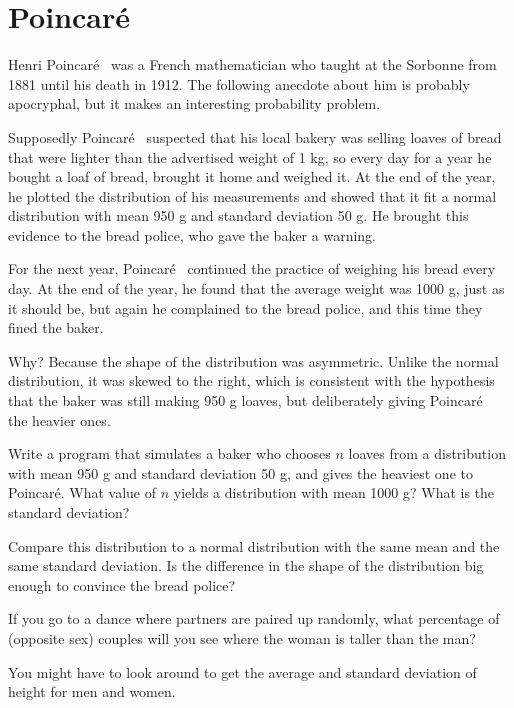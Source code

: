 \documentclass[10pt]{book}
\begin{document}
\newcommand{\Poincare}{Poincar\'{e}}

\section{\Poincare}

Henri \Poincare~ was a French mathematician who taught at the
Sorbonne from 1881 until his death in 1912.  The following
anecdote about him is probably apocryphal, but it makes
an interesting probability problem.

Supposedly \Poincare~ suspected that his local bakery was
selling loaves of bread that were lighter than the advertised
weight of 1 kg, so every day for a year he bought a loaf of
bread, brought it home and weighed it.  At the end of the
year, he plotted the distribution of his measurements and
showed that it fit a normal distribution with mean 950 g and
standard deviation 50 g.  He brought this evidence to
the bread police, who gave the baker a warning.

For the next year, \Poincare~ continued the practice of weighing his
bread every day.  At the end of the year, he found that the average
weight was 1000 g, just as it should be, but again he complained to
the bread police, and this time they fined the baker.

Why?  Because the shape of the distribution was asymmetric.  Unlike
the normal distribution, it was skewed to the right, which is
consistent with the hypothesis that the baker was still making 950 g
loaves, but deliberately giving \Poincare~ the heavier ones.


\begin{ex}

Write a program that simulates a baker who chooses $n$ loaves from a
distribution with mean 950 g and standard deviation 50 g, and gives
the heaviest one to \Poincare.  What value of $n$ yields a
distribution with mean 1000 g?  What is the standard deviation?

Compare this distribution to a normal distribution with the same mean
and the same standard deviation.  Is the difference in the shape of
the distribution big enough to convince the bread police?

\end{ex}


\begin{ex}

If you go to a dance where partners are paired up randomly,
what percentage of (opposite sex) couples will you see where
the woman is taller than the man?

You might have to look around to get the average and standard
deviation of height for men and women.

\end{ex}
\end{document}
